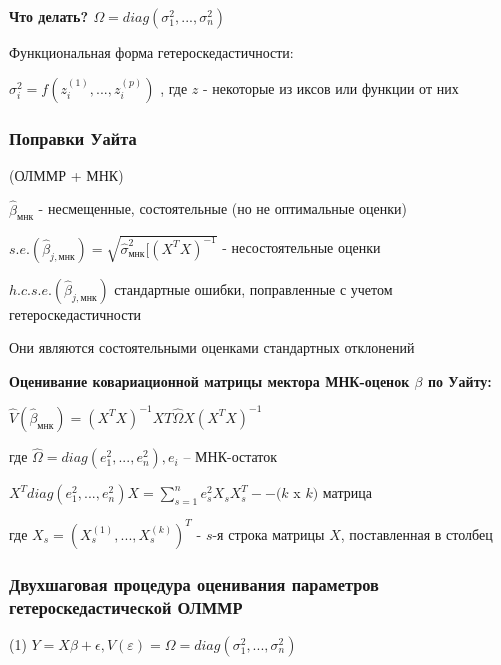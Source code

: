 \documentclass{article}
\begin{document}
\vspace{2mm}
\textbf{Что делать? $\Omega = diag(\sigma^2_1, ... , \sigma^2_n)$} \par 


Функциональная форма гетероскедастичности: \par 
$\sigma^2_i = f(z_i^{(1)}, ... , z_i^{(p)})$ , где $z$ - некоторые из иксов или функции от них

\newpage
\subsubsection{Поправки Уайта}
(ОЛММР + МНК)

$\hat{\beta}_{\text{мнк}}$ - несмещенные, состоятельные (но не оптимальные оценки)\par
$s.e. (\hat{\beta}_{j,\text{мнк}}) = \sqrt{\hat{\sigma}_{\text{мнк}}^2[(X^TX)^{-1}}$ - несостоятельные оценки\par
$h.c.s.e.(\hat{\beta}_{j, \text{мнк}})$ стандартные ошибки, поправленные с учетом гетероскедастичности\par

\vspace{2mm}
Они являются состоятельными оценками стандартных отклонений\par

\vspace{2mm}
\textbf{Оценивание ковариационной матрицы мектора МНК-оценок $\beta$ по Уайту:}

$\hat{V}(\hat{\beta}_{\text{мнк}}) = (X^TX)^{-1}XT\hat{\Omega}X(X^TX)^{-1}$

где $\hat{\Omega} = diag(e^2_1, ... , e^2_n), e_i$ -- МНК-остаток

$X^Tdiag(e^2_1, ... , e^2_n)X = \sum_{s = 1}^ne^2_sX_sX_s^T -- (k$ x $k)$ матрица

где $X_s = (X_s^{(1)}, ... , X_s^{(k)})^T$ - $s$-я строка матрицы $X$, поставленная в столбец

\subsubsection{Двухшаговая процедура оценивания параметров гетероскедастической ОЛММР}
(1) $Y = X\beta + \epsilon, V(\varepsilon) = \Omega = diag(\sigma^2_1, ... , \sigma^2_n)$ \par
\end{document}
